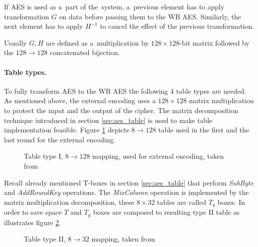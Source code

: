 \documentclass[11pt,oneside,final]{fithesis2}
\begin{document}
    If AES is used as a~part of the~system, a~previous element has to apply transformation $G$ on data before passing them to the WB AES. Similarly, the next element has to apply
    $H^{-1}$ to cancel the effect of the previous transformation. 
    
    Usually $G, H$ are defined as a~multiplication by $128\times128$-bit matrix followed by the $128 \rightarrow 128$ concatenated bijection. 

    
    \paragraph*{Table types.} To fully transform AES to the WB AES the following 4 table types are needed.
    As mentioned above, the external encoding uses a $128\times128$ matrix multiplication to protect the input and the output of the cipher. 
    The matrix decomposition technique introduced in section \ref{sec:aes_table} is used to make table implementation feasible. Figure \ref{fig:aes_t1} depicts
    $8\rightarrow128$ table used in the first and the last round for the external encoding.

    \begin{figure}[!htb]
    \begin{center}
    \leavevmode
    \centerline{}
    \end{center}
    \caption{Table type I, $8\rightarrow128$ mapping, used for external encoding, taken from~\citep{wyseurPhd}}
    \label{fig:aes_t1}
    \end{figure}
    
    Recall already mentioned T-boxes in section \ref{sec:aes_table} that perform \emph{SubByte} and \emph{AddRoundKey} operations. The \emph{MixColumn} operation 
    is implemented by the matrix multiplication decomposition, these $8\times32$ tables are called $T_y$ boxes. In order to save space
    $T$ and $T_y$ boxes are composed to resulting type II table as illustrates figure \ref{fig:aes_t2}.

    \begin{figure}[!htb]
    \begin{center}
    \leavevmode
    \centerline{}
    \end{center}
    \caption{Table type II, $8\rightarrow32$ mapping, taken from~\citep{wyseurPhd}}
    \label{fig:aes_t2}
    \end{figure}
\end{document}
